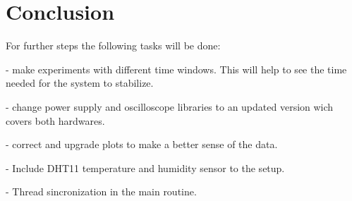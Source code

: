 \section{Conclusion}

For further steps the following tasks will be done:

- make experiments with different time windows. This will help to see the time needed for the system to stabilize.

- change power supply and oscilloscope libraries to an updated version wich covers both hardwares.

- correct and upgrade plots to make a better sense of the data.

- Include DHT11 temperature and humidity sensor to the setup.

- Thread sincronization in the main routine.

